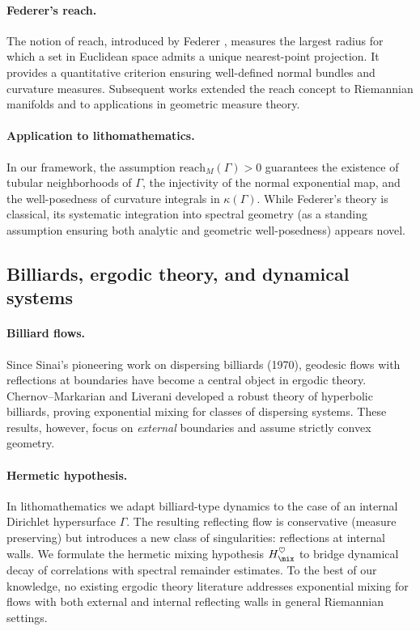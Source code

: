 \paragraph{Federer’s reach.}
The notion of reach, introduced by Federer \cite{Federer1959}, 
measures the largest radius for which a set in Euclidean space admits a unique nearest-point projection. 
It provides a quantitative criterion ensuring well-defined normal bundles and curvature measures. 
Subsequent works extended the reach concept to Riemannian manifolds and to applications in geometric measure theory. 

\paragraph{Application to lithomathematics.}
In our framework, the assumption $\mathrm{reach}_M(\Gamma)>0$ 
guarantees the existence of tubular neighborhoods of $\Gamma$, 
the injectivity of the normal exponential map, and the well-posedness of curvature integrals in $\kappa(\Gamma)$. 
While Federer’s theory is classical, its systematic integration into spectral geometry 
(as a standing assumption ensuring both analytic and geometric well-posedness) 
appears novel. 

\subsection{Billiards, ergodic theory, and dynamical systems}

\paragraph{Billiard flows.}
Since Sinai’s pioneering work on dispersing billiards (1970), 
geodesic flows with reflections at boundaries have become a central object in ergodic theory. 
Chernov--Markarian and Liverani developed a robust theory of hyperbolic billiards, 
proving exponential mixing for classes of dispersing systems. 
These results, however, focus on \emph{external} boundaries and assume strictly convex geometry. 

\paragraph{Hermetic hypothesis.}
In lithomathematics we adapt billiard-type dynamics to the case of an internal Dirichlet hypersurface $\Gamma$. 
The resulting reflecting flow is conservative (measure preserving) but introduces a new class of singularities: 
reflections at internal walls. 
We formulate the hermetic mixing hypothesis $H_{\mix}^\heartsuit$ 
to bridge dynamical decay of correlations with spectral remainder estimates. 
To the best of our knowledge, no existing ergodic theory literature addresses exponential mixing for flows with both external and internal reflecting walls in general Riemannian settings. 

